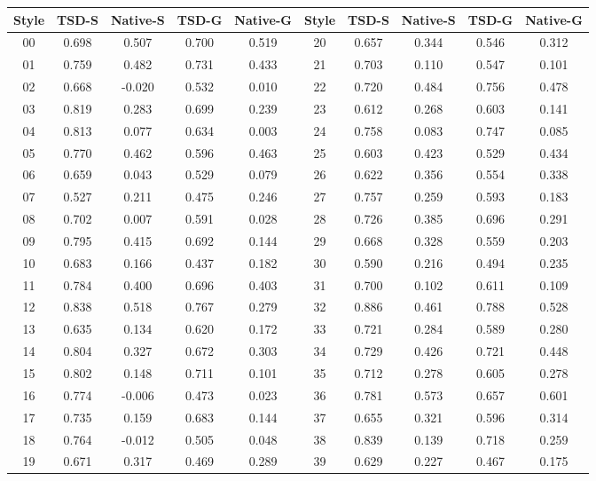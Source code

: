 \begin{tabular}{ccccc@{\hspace{14pt}}ccccc}
\toprule
Style & TSD-S & Native-S & TSD-G & Native-G & Style & TSD-S & Native-S & TSD-G & Native-G \\
\midrule
00 & 0.698 & 0.507 & 0.700 & 0.519 & 20 & 0.657 & 0.344 & 0.546 & 0.312 \\
01 & 0.759 & 0.482 & 0.731 & 0.433 & 21 & 0.703 & 0.110 & 0.547 & 0.101 \\
02 & 0.668 & -0.020 & 0.532 & 0.010 & 22 & 0.720 & 0.484 & 0.756 & 0.478 \\
03 & 0.819 & 0.283 & 0.699 & 0.239 & 23 & 0.612 & 0.268 & 0.603 & 0.141 \\
04 & 0.813 & 0.077 & 0.634 & 0.003 & 24 & 0.758 & 0.083 & 0.747 & 0.085 \\
05 & 0.770 & 0.462 & 0.596 & 0.463 & 25 & 0.603 & 0.423 & 0.529 & 0.434 \\
06 & 0.659 & 0.043 & 0.529 & 0.079 & 26 & 0.622 & 0.356 & 0.554 & 0.338 \\
07 & 0.527 & 0.211 & 0.475 & 0.246 & 27 & 0.757 & 0.259 & 0.593 & 0.183 \\
08 & 0.702 & 0.007 & 0.591 & 0.028 & 28 & 0.726 & 0.385 & 0.696 & 0.291 \\
09 & 0.795 & 0.415 & 0.692 & 0.144 & 29 & 0.668 & 0.328 & 0.559 & 0.203 \\
10 & 0.683 & 0.166 & 0.437 & 0.182 & 30 & 0.590 & 0.216 & 0.494 & 0.235 \\
11 & 0.784 & 0.400 & 0.696 & 0.403 & 31 & 0.700 & 0.102 & 0.611 & 0.109 \\
12 & 0.838 & 0.518 & 0.767 & 0.279 & 32 & 0.886 & 0.461 & 0.788 & 0.528 \\
13 & 0.635 & 0.134 & 0.620 & 0.172 & 33 & 0.721 & 0.284 & 0.589 & 0.280 \\
14 & 0.804 & 0.327 & 0.672 & 0.303 & 34 & 0.729 & 0.426 & 0.721 & 0.448 \\
15 & 0.802 & 0.148 & 0.711 & 0.101 & 35 & 0.712 & 0.278 & 0.605 & 0.278 \\
16 & 0.774 & -0.006 & 0.473 & 0.023 & 36 & 0.781 & 0.573 & 0.657 & 0.601 \\
17 & 0.735 & 0.159 & 0.683 & 0.144 & 37 & 0.655 & 0.321 & 0.596 & 0.314 \\
18 & 0.764 & -0.012 & 0.505 & 0.048 & 38 & 0.839 & 0.139 & 0.718 & 0.259 \\
19 & 0.671 & 0.317 & 0.469 & 0.289 & 39 & 0.629 & 0.227 & 0.467 & 0.175 \\
\bottomrule
\end{tabular}

